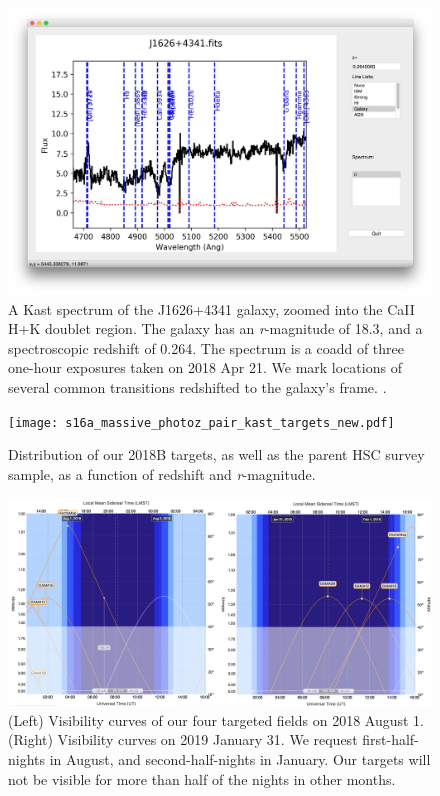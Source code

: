 \documentclass[letterpaper,12pt]{article}
\begin{document}
\begin{figure}[hbt]
\includegraphics[width=\textwidth]{J1626.pdf}
\caption{
A Kast spectrum of the J1626+4341 galaxy, zoomed into the CaII H+K doublet region. The galaxy has an {\it r}-magnitude 
of 18.3, and a spectroscopic redshift of 0.264. The spectrum is a coadd of three one-hour exposures taken on 2018 Apr 21. 
We mark locations of several common transitions redshifted to the galaxy's frame. 
.}
\label{spectrum}
\end{figure}

\begin{figure}
\texttt{[image: s16a\_massive\_photoz\_pair\_kast\_targets\_new.pdf]}
\caption{
Distribution of our 2018B targets, as well as the parent HSC survey sample, as a function of redshift and {\it r}-magnitude.}
\end{figure}

\begin{figure}[hbt]
\includegraphics[width=\textwidth]{visibility/2018B.pdf}
\caption{
(Left) Visibility curves of our four targeted fields on 2018 August 1. (Right) Visibility curves on 2019 January 31. We 
request first-half-nights in August, and second-half-nights in January. Our targets will not be visible for more than half 
of the nights in other months.}
\end{figure}
\end{document}
